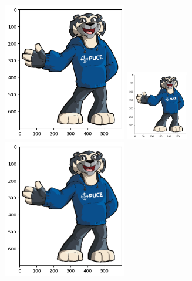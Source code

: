 \begin{frame}

    \includegraphics[width=5.4cm]{Figuras/output1.png}
    \includegraphics[width=2.7cm]{Figuras/output2.png}
    \includegraphics[width=5.4cm]{Figuras/output3.png}

\end{frame}

